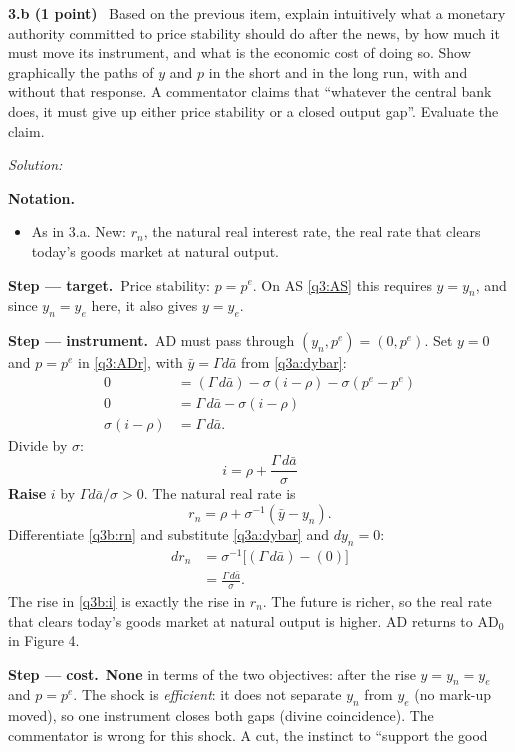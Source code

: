 \documentclass[11pt,a4paper]{article}
\newif\ifsolucoes
\newcommand{\sub}[2]{\Needspace{8\baselineskip}\par\medskip\noindent\textbf{#1 (#2)}~}
\newcommand{\resolespaco}[1][6cm]{\ifsolucoes\else\par\textit{Solution:}\vspace{#1}\par\fi}
\newcommand{\passo}[2]{\par\smallskip\noindent\textbf{Step --- #1.}~#2}
\newenvironment{notacao}{\par\smallskip\noindent\textbf{Notation.}\begin{itemize}[leftmargin=1.4em,topsep=1pt,itemsep=0pt]\small}{\end{itemize}}
\begin{document}
\sub{3.b}{1 point} Based on the previous item, explain intuitively what a monetary authority committed
to price stability should do after the news, by how much it must move its instrument, and what is the
economic cost of doing so. Show graphically the paths of $y$ and $p$ in the short and in the long run,
with and without that response. A commentator claims that ``whatever the central bank does, it must
give up either price stability or a closed output gap''. Evaluate the claim.
\resolespaco[7cm]
\begin{sol}
\begin{notacao}
\item As in 3.a. New: $r_n$, the natural real interest rate, the real rate that clears today's goods
market at natural output.
\end{notacao}
\passo{target}{Price stability: $p=p^e$. On AS \eqref{q3:AS} this requires $y=y_n$, and since
$y_n=y_e$ here, it also gives $y=y_e$.}
\passo{instrument}{AD must pass through $(y_n,p^e)=(0,p^e)$. Set $y=0$ and $p=p^e$ in \eqref{q3:ADr},
with $\bar y=\Gamma d\bar a$ from \eqref{q3a:dybar}:}
\begin{align*}
0 &= (\Gamma\,d\bar a)-\sigma(i-\rho)-\sigma(p^e-p^e)\\
0 &= \Gamma\,d\bar a-\sigma(i-\rho)\\
\sigma(i-\rho) &= \Gamma\,d\bar a.
\end{align*}
Divide by $\sigma$:
\begin{equation}
\boxed{i=\rho+\frac{\Gamma\,d\bar a}{\sigma}} \label{q3b:i}
\end{equation}
\textbf{Raise} $i$ by $\Gamma d\bar a/\sigma>0$. The natural real rate is
\begin{equation}
r_n=\rho+\sigma^{-1}(\bar y-y_n). \label{q3b:rn}
\end{equation}
Differentiate \eqref{q3b:rn} and substitute \eqref{q3a:dybar} and $dy_n=0$:
\begin{align*}
dr_n &= \sigma^{-1}\big[(\Gamma\,d\bar a)-(0)\big]\\
&= \frac{\Gamma\,d\bar a}{\sigma}.
\end{align*}
The rise in \eqref{q3b:i} is exactly the rise in $r_n$. The future is richer, so the real rate that clears today's goods market
at natural output is higher. AD returns to AD$_0$ in Figure 4.
\passo{cost}{\textbf{None} in terms of the two objectives: after the rise $y=y_n=y_e$ and $p=p^e$. The shock is
\emph{efficient}: it does not separate $y_n$ from $y_e$ (no mark-up moved), so one instrument closes both gaps
(divine coincidence). The commentator is wrong for this shock. A cut, the instinct to ``support the good
}
\end{sol}
\end{document}
